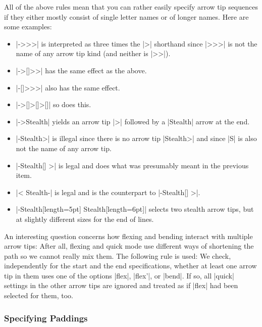 All of the above rules mean that you can rather easily specify arrow
tip sequences if they either mostly consist of single letter names or
of longer names. Here are some examples:

\begin{itemize}
\item |->>>| is interpreted as three times the |>| shorthand since
  |>>>| is not the name of any arrow tip kind (and neither is |>>|).
\item |->[]>>| has the same effect as the above.
\item |-[]>>>| also has the same effect.%
\item |->[]>[]>[]| so does this.
\item |->Stealth| yields an arrow tip |>| followed by a |Stealth|
  arrow at the end.
\item |-Stealth>| is illegal since there is no arrow tip |Stealth>|
  and since |S| is also not the name of any arrow tip.
\item |-Stealth[] >| is legal and does what was presumably meant in the previous item.
\item |< Stealth-| is legal and is the counterpart to |-Stealth[] >|.
\item |-Stealth[length=5pt] Stealth[length=6pt]| selects two stealth
  arrow tips, but at slightly different sizes for the end of lines.
\end{itemize}


An interesting question concerns how flexing and bending interact with
multiple arrow tips: After all, flexing and quick mode use different
ways of shortening the path so we cannot really mix them. The
following rule is used: We check, independently for the start and the
end specifications, whether at least one arrow tip in them uses one of
the options |flex|, |flex'|, or |bend|. If so, all |quick| settings in
the other arrow tips are ignored and treated as if |flex| had been
selected for them, too.


\subsubsection{Specifying Paddings}

